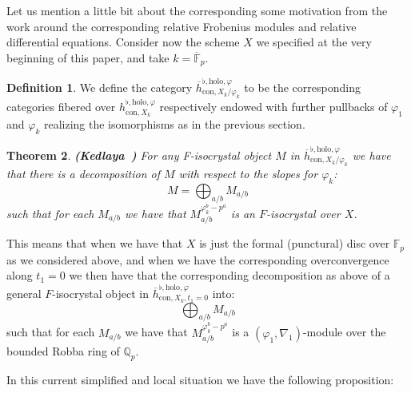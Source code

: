 \documentclass[11pt]{book}
\newtheorem{theorem}{Theorem}[section]
\theoremstyle{definition}
\newtheorem{definition}[theorem]{Definition}
\numberwithin{equation}{section}
\begin{document}
Let us mention a little bit about the corresponding some motivation from the work \cite{Ked9} around the corresponding relative Frobenius modules and relative differential equations. Consider now the scheme $X$ we specified at the very beginning of this paper, and take $k=\overline{\mathbb{F}}_p$.

\begin{definition}
We define the category $\overline{h}^{\flat,\mathrm{holo},\varphi}_{\mathrm{con},X_k/\varphi_k}$ to be the corresponding categories fibered over $h^{\flat,\mathrm{holo},\varphi}_{\mathrm{con},X_k}$ respectively endowed with further pullbacks of $\varphi_1$ and $\varphi_k$ realizing the isomorphisms as in the previous section.	
\end{definition}




\begin{theorem}\mbox{\bf{(Kedlaya \cite[Theorem 7.3, Corollary 7.4]{Ked9})}}
For any F-isocrystal object $M$ in $\overline{h}^{\flat,\mathrm{holo},\varphi}_{\mathrm{con},X_k/\varphi_k}$ we have that there is a decomposition of $M$ with respect to the slopes for $\varphi_k$:
\begin{displaymath}
M=\bigoplus_{a/b}M_{a/b}	
\end{displaymath}
such that for each $M_{a/b}$ we have that $M_{a/b}^{\varphi_k^b-p^a}$ is an $F$-isocrystal over $X$.
\end{theorem}





\indent This means that when we have that $X$ is just the formal (punctural) disc over $\mathbb{F}_p$ as we considered above, and when we have the corresponding overconvergence along $t_1=0$ we then have that the corresponding decomposition as above of a general $F$-isocrystal object in $\overline{h}^{\flat,\mathrm{holo},\varphi}_{\mathrm{con},X_k,t_1=0}$ into:
\begin{displaymath}
\bigoplus_{a/b}M_{a/b}	
\end{displaymath}
such that for each $M_{a/b}$ we have that $M_{a/b}^{\varphi_k^b-p^a}$ is a $(\varphi_1,\nabla_1)$-module over the bounded Robba ring of $\mathbb{Q}_p$. 



\indent In this current simplified and local situation we have the following proposition:
\end{document}
